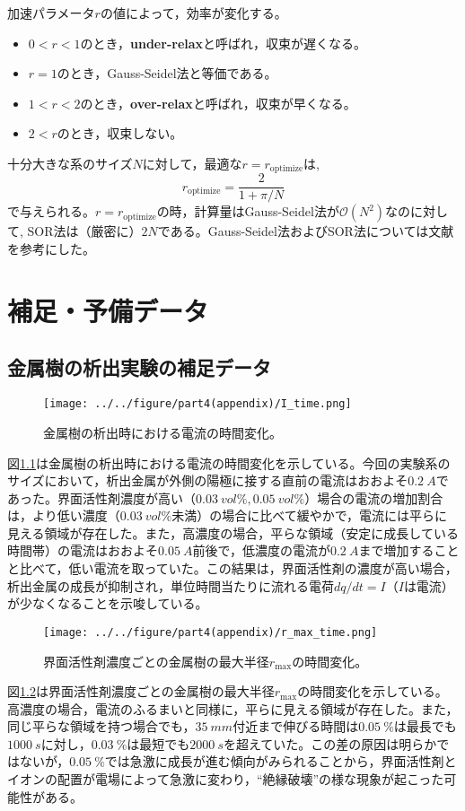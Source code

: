 \documentclass[autodetect-engine,dvi=dvipdfmx,a4paper,ja=standard,oneside,openany,11pt]{bxjsbook}
\begin{document}
加速パラメータ$r$の値によって，効率が変化する。
\begin{itemize}
  \item $0<r<1$のとき，\textbf{under-relax}と呼ばれ，収束が遅くなる。
  \item $r=1$のとき，Gauss-Seidel法と等価である。
  \item $1<r<2$のとき，\textbf{over-relax}と呼ばれ，収束が早くなる。
  \item $2<r$のとき，収束しない。
\end{itemize}
十分大きな系のサイズ$N$に対して，最適な$r=r_{\mathrm{optimize}}$は,
\begin{equation}
  r_{\mathrm{optimize}}=\frac{2}{1+\pi/N}
  \label{eq:optimaze_r}
\end{equation}
で与えられる。$r=r_{\mathrm{optimize}}$の時，計算量はGauss-Seidel法が$\mathcal{O}(N^2)$なのに対して, SOR法は（厳密に）$2N$である。Gauss-Seidel法およびSOR法については文献\cite{hinch2020numerical}を参考にした。

\chapter{補足・予備データ}
\section{金属樹の析出実験の補足データ}
\begin{figure}[htbp]
  \centering
  \texttt{[image: ../../figure/part4(appendix)/I\_time.png]}
  \caption{金属樹の析出時における電流の時間変化。}
  \label{fig:I_time}
\end{figure}
図\ref{fig:I_time}は金属樹の析出時における電流の時間変化を示している。今回の実験系のサイズにおいて，析出金属が外側の陽極に接する直前の電流はおおよそ$\SI{0.2}{A}$であった。界面活性剤濃度が高い（$\SI{0.03}{vol\%}, \SI{0.05}{vol\%}$）場合の電流の増加割合は，より低い濃度（$\SI{0.03}{vol\%}$未満）の場合に比べて緩やかで，電流には平らに見える領域が存在した。また，高濃度の場合，平らな領域（安定に成長している時間帯）の電流はおおよそ$\SI{0.05}{A}$前後で，低濃度の電流が$\SI{0.2}{A}$まで増加することと比べて，低い電流を取っていた。この結果は，界面活性剤の濃度が高い場合，析出金属の成長が抑制され，単位時間当たりに流れる電荷$dq/dt=I$（$I$は電流）が少なくなることを示唆している。
\begin{figure}[htbp]
  \centering
  \texttt{[image: ../../figure/part4(appendix)/r\_max\_time.png]}
  \caption{界面活性剤濃度ごとの金属樹の最大半径$r_{\mathrm{max}}$の時間変化。}
  \label{fig:r_max_time}
\end{figure}
図\ref{fig:r_max_time}は界面活性剤濃度ごとの金属樹の最大半径$r_{\mathrm{max}}$の時間変化を示している。高濃度の場合，電流のふるまいと同様に，平らに見える領域が存在した。また，同じ平らな領域を持つ場合でも，$\SI{35}{mm}$付近まで伸びる時間は$\SI{0.05}{\%}$は最長でも$\SI{1000}{s}$に対し，$\SI{0.03}{\%}$は最短でも$\SI{2000}{s}$を超えていた。この差の原因は明らかではないが，$\SI{0.05}{\%}$では急激に成長が進む傾向がみられることから，界面活性剤とイオンの配置が電場によって急激に変わり，``絶縁破壊''の様な現象が起こった可能性がある。
\end{document}
